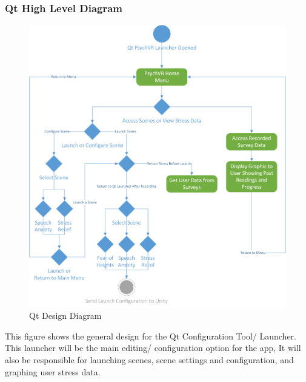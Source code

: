 \documentclass[a4paper,10pt]{article}
\begin{document}
		\subsubsection{Qt High Level Diagram}
		\begin{figure}[H]
					\includegraphics[width=\linewidth,height=\paperheight,keepaspectratio]{qtConfigDiag.png}
					\caption{Qt Design Diagram}
					\label{fig:qtHighLevel}
				\end{figure}
This figure shows the general design for the Qt Configuration Tool/ Launcher. This launcher will be the main editing/ 
configuration option for the app, It will also be responsible for launching scenes, scene settings and configuration, and graphing user stress data.

		\pagebreak
\end{document}
